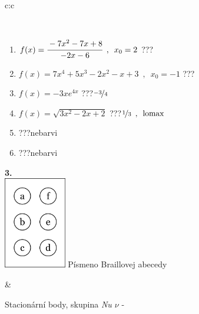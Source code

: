 \documentclass[10pt]{report}
\begin{document}
\begin{tabular}{c:c}
\begin{minipage}[c][104.5mm][t]{0.5\linewidth}
\begin{center}
\begin{minipage}{0.95\linewidth}
\begin{center}
\end{center}
\end{minipage}
\\[1mm]
\begin{minipage}{0.79\linewidth}
\begin{center}
\begin{varwidth}{\linewidth}
\begin{enumerate}
\normalsize
\item $f(x)=\cfrac{-7x^2-7x+8}{-2x-6}\enspace , \enspace x_0=2$\quad \dotfill\; ???\;\dotfill \quad {}
\item $f(x)=7x^4+5x^3-2x^2-x+3\enspace , \enspace x_0=-1$\quad \dotfill\; ???\;\dotfill \quad {}
\item $f(x)=-3xe^{4x}$\quad \dotfill\; ???\;\dotfill \quad $\nicefrac{-3}{4}$
\item $f(x)=\sqrt{3x^2-2x+2}$\quad \dotfill\; ???\;\dotfill \quad $\nicefrac{1}{3}\enspace , \enspace\mathrm{lomax}$
\item \quad \dotfill\; ???\;\dotfill \quad nebarvi
\item \quad \dotfill\; ???\;\dotfill \quad nebarvi
\end{enumerate}
\end{varwidth}
\end{center}
\end{minipage}
\begin{minipage}{0.20\linewidth}
\begin{center}
{\Huge\bfseries 3.} \\[2mm]
\includegraphics[height=40mm]{../images/braille.png}
{\small Písmeno Braillovej abecedy}
\end{center}
\end{minipage}
\end{center}
\end{minipage}
&
\begin{minipage}[c][104.5mm][t]{0.5\linewidth}
\begin{center}
\vspace{7mm}
{\huge Stacionární body, skupina \textit{Nu $\nu$} -}\\[5mm]

\end{center}
\end{minipage}
\end{tabular}
\end{document}
